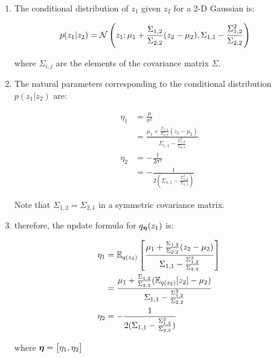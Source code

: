 \documentclass{article}
\begin{document}
\begin{enumerate}

\item
The conditional distribution of $z_1$ given $z_2$ for a 2-D Gaussian is:

\begin{equation}\begin{split}
p(z_1 | z_2) &= \mathcal{N}\left(z_1; \mu_1 + \frac{\Sigma_{1,2}}{\Sigma_{2,2}}(z_2 - \mu_2), \Sigma_{1,1} - \frac{\Sigma_{1,2}^2}{\Sigma_{2,2}}\right)
\end{split}\end{equation}

where $\Sigma_{i,j}$ are the elements of the covariance matrix $\Sigma$.

\item
The natural parameters corresponding to the conditional distribution $p(z_1|z_2)$ are:
	

\begin{equation}\begin{split}
\eta_1 &= \frac{ \mu}{ \sigma^2}\\
&=\frac{\mu_1 + \frac{\Sigma_{1,2}}{\Sigma_{2,2}}(z_2 - \mu_2)}{\Sigma_{1,1} - \frac{\Sigma_{1,2}^2}{\Sigma_{2,2}}} \\
\eta_2 &= - \frac{1}{ 2 \sigma^2}\\
&= -\frac{1}{2(\Sigma_{1,1} - \frac{\Sigma_{1,2}^2}{\Sigma_{2,2}})}
\end{split}\end{equation}

Note that $\Sigma_{1,2} = \Sigma_{2,1}$ in a symmetric covariance matrix. 

\item
therefore, the update formula for $q_{\boldsymbol{\eta}}(z_1)$ is:

\begin{equation}\begin{split}
\eta_1 &= \mathbb{E}_{q(z_2)} \left[ \frac{\mu_1 + \frac{\Sigma_{1,2}}{\Sigma_{2,2}}(z_2 - \mu_2)}{\Sigma_{1,1} - \frac{\Sigma_{1,2}^2}{\Sigma_{2,2}}} \right] \\
&= \frac{\mu_1 + \frac{\Sigma_{1,2}}{\Sigma_{2,2}}(\mathbb{E}_{q(z_2)}[z_2] - \mu_2)}{\Sigma_{1,1} - \frac{\Sigma_{1,2}^2}{\Sigma_{2,2}}} \\
\eta_2 &= -\frac{1}{2(\Sigma_{1,1} - \frac{\Sigma_{1,2}^2}{\Sigma_{2,2}})}
\end{split}\end{equation}

where $\boldsymbol{\eta} = \big[ \eta_1, \eta_2 \big]$


\end{enumerate}
\end{document}
